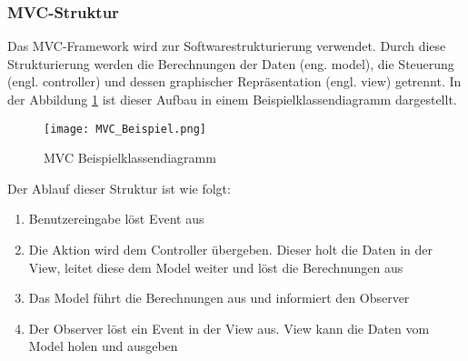 \subsubsection{MVC-Struktur}\label{subsec:mvc}

Das MVC-Framework wird zur Softwarestrukturierung verwendet. Durch diese Strukturierung werden die Berechnungen der Daten (eng. model), die Steuerung (engl. controller) und dessen graphischer Repräsentation (engl. view) getrennt. In der Abbildung \ref{fig:MVCBeispiel} ist dieser Aufbau in einem Beispielklassendiagramm dargestellt. \cite{MVCDesignPattern}

\begin{figure}[H]
	\centering
	\texttt{[image: MVC\_Beispiel.png]}
	\caption{MVC Beispielklassendiagramm \cite{MVCBeispiel}}
	\label{fig:MVCBeispiel}
\end{figure}

Der Ablauf dieser Struktur ist wie folgt: 

\begin{enumerate}
\item Benutzereingabe löst Event aus
\item Die Aktion wird dem Controller übergeben. Dieser holt die Daten in der View, leitet diese dem Model weiter und löst die Berechnungen aus
\item Das Model führt die Berechnungen aus und informiert den Observer
\item Der Observer löst ein Event in der View aus. View kann die Daten vom Model holen und ausgeben
\end{enumerate}
